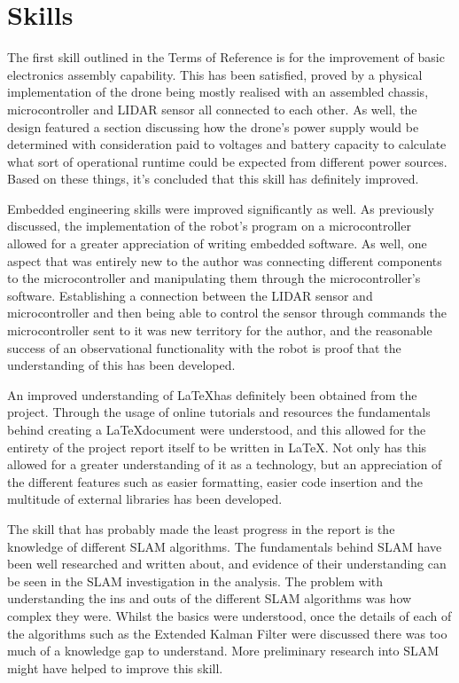 		\section{Skills}
		The first skill outlined in the Terms of Reference is for the improvement of basic electronics assembly capability. This has been satisfied, proved by a physical implementation of the drone being mostly realised with an assembled chassis, microcontroller and LIDAR sensor all connected to each other. As well, the design featured a section discussing how the drone's power supply would be determined with consideration paid to voltages and battery capacity to calculate what sort of operational runtime could be expected from different power sources. Based on these things, it's concluded that this skill has definitely improved.
		
		Embedded engineering skills were improved significantly as well. As previously discussed, the implementation of the robot's program on a microcontroller allowed for a greater appreciation of writing embedded software. As well, one aspect that was entirely new to the author was connecting different components to the microcontroller and manipulating them through the microcontroller's software. Establishing a connection between the LIDAR sensor and microcontroller and then being able to control the sensor through commands the microcontroller sent to it was new territory for the author, and the reasonable success of an observational functionality with the robot is proof that the understanding of this has been developed.
		
		An improved understanding of \LaTeX has definitely been obtained from the project. Through the usage of online tutorials and resources the fundamentals behind creating a \LaTeX document were understood, and this allowed for the entirety of the project report itself to be written in \LaTeX. Not only has this allowed for a greater understanding of it as a technology, but an appreciation of the different features such as easier formatting, easier code insertion and the multitude of external libraries has been developed.
		
		The skill that has probably made the least progress in the report is the knowledge of different SLAM algorithms. The fundamentals behind SLAM have been well researched and written about, and evidence of their understanding can be seen in the SLAM investigation in the analysis. The problem with understanding the ins and outs of the different SLAM algorithms was how complex they were. Whilst the basics were understood, once the details of each of the algorithms such as the Extended Kalman Filter were discussed there was too much of a knowledge gap to understand. More preliminary research into SLAM might have helped to improve this skill. 
		
